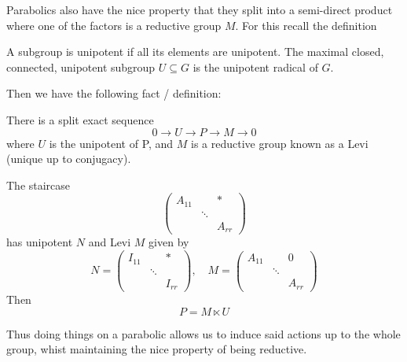 Parabolics also have the nice property that they split into a semi-direct product 
where one of the factors is a reductive group \(M\). For this recall the definition
\begin{definition}
    A subgroup is unipotent if all its elements are unipotent.
    The maximal closed, connected, unipotent subgroup \(U\subseteq G\) is the unipotent radical of \(G\). 
\end{definition}
Then we have the following fact / definition:

\begin{Lemma}
    There is a split exact sequence 
    \[0 \to U \to P \to M \to 0\]
    where \(U\) is the unipotent of P, and \(M\) is a reductive group known as a Levi (unique up to conjugacy).
\end{Lemma}

\begin{example}
     The staircase 
    \[\begin{pmatrix}
        A_{11} && \ast\\
         & \ddots & \\
         && A_{rr}
    \end{pmatrix}\]
    has unipotent \(N\) and Levi \(M\) given by 
    \[N = \begin{pmatrix}
        I_{11} && \ast\\
         & \ddots & \\
         && I_{rr}
    \end{pmatrix}, \quad M = \begin{pmatrix}
        A_{11} && 0\\
         & \ddots & \\
         && A_{rr}
    \end{pmatrix}\]
    Then 
    \[P = M\ltimes U\]
\end{example}

Thus doing things on a parabolic allows us to induce said actions up to the whole group, whist maintaining the nice property of being reductive. 


